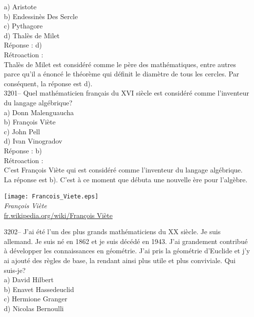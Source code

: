\documentclass[letterpaper, 12pt]{article}
\begin{document}
a) Aristote\\
b) Endessin\`es Des Sercle\\
c) Pythagore\\
d) Thal\`es de Milet\\

R\'eponse : d)\\

R\'etroaction :\\
Thal\`es de Milet est consid\'er\'e comme le p\`ere des math\'ematiques, entre autres parce qu'il a \'enonc\'e le th\'eor\`eme qui d\'efinit le diam\`etre de tous les cercles. Par cons\'equent, la r\'eponse est d).\\



3201-- Quel math\'ematicien fran\c cais du {\scriptsize XVI\ieme{}} si\`ecle est consid\'er\'e comme l'inventeur du langage alg\'ebrique?\\

a) Donn Malenguaucha\\
b) Fran\c cois Vi\`ete\\
c) John Pell\\
d) Ivan Vinogradov\\

R\'eponse : b)\\

R\'etroaction :\\
C'est Fran\c cois Vi\`ete qui est consid\'er\'e comme l'inventeur du langage alg\'ebrique. La r\'eponse est b). C'est \`a ce moment que d\'ebuta une nouvelle \`ere pour l'alg\`ebre.
\begin{center}
\texttt{[image: Francois\_Viete.eps]}\\
\emph{{\small Fran\c cois Vi\`ete}}\\
\href{http://fr.wikipedia.org/wiki/Fran\%C3\%A7ois_Vi\%C3\%A8te}{fr.wikipedia.org/wiki/Fran\c cois Vi\`ete}\\[5mm]
\end{center}



3202-- J'ai \'et\'e l'un des plus grands math\'ematiciens du {\scriptsize XX\ieme{}} si\`ecle. Je suis allemand. Je suis n\'e en 1862 et je suis d\'ec\'ed\'e en 1943. J'ai grandement contribu\'e \`a d\'evelopper les connaissances en g\'eom\'etrie. J'ai pris la g\'eom\'etrie d'Euclide et j'y ai ajout\'e des r\`egles de base, la rendant ainsi plus utile et plus conviviale. Qui suis-je?\\

a) David Hilbert\\
b) Enavet Hassedeuclid\\
c) Hermione Granger\\
d) Nicolas Bernoulli\\
\end{document}
